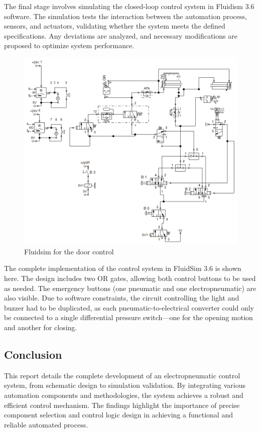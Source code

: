 The final stage involves simulating the closed-loop control system in Fluidism 3.6 software. 
The simulation tests the interaction between the automation process, sensors, and actuators, 
validating whether the system meets the defined specifications. Any deviations are analyzed, 
and necessary modifications are proposed to optimize system performance.

\begin{figure}[H]
    \includegraphics[width=16cm]{Images/fluidsim.png}
    \centering
    \caption{Fluidsim for the door control}
    \label{fig:fluidsim}
\end{figure}

The complete implementation of the control system in FluidSim 3.6 is shown here. The design includes two OR gates, 
allowing both control buttons to be used as needed. The emergency buttons (one pneumatic and one electropneumatic) 
are also visible. Due to software constraints, the circuit controlling the light and buzzer had to be duplicated, as 
each pneumatic-to-electrical converter could only be connected to a single differential pressure switch—one for the 
opening motion and another for closing.\\

\subsection{Conclusion}

This report details the complete development of an electropneumatic control system, from schematic 
design to simulation validation. By integrating various automation components and methodologies, 
the system achieves a robust and efficient control mechanism. The findings highlight the importance 
of precise component selection and control logic design in achieving a functional and reliable 
automated process.